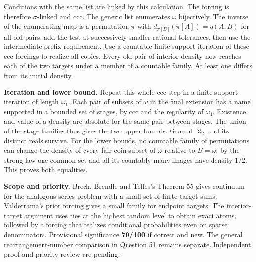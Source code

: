 \documentclass[11pt]{article}
\begin{document}
Conditions with the same list are linked by this calculation. The forcing is therefore \(\sigma\)-linked and ccc. The generic list enumerates \(\omega\) bijectively. The inverse of the enumerating map is a permutation \(\pi\) with \(d_{\pi[B]}(\pi[A])=q(A,B)\) for all old pairs: add the test at successively smaller rational tolerances, then use the intermediate-prefix requirement. Use a countable finite-support iteration of these ccc forcings to realize all copies. Every old pair of interior density now reaches each of the two targets under a member of a countable family. At least one differs from its initial density.

\textbf{Iteration and lower bound.} Repeat this whole ccc step in a finite-support iteration of length \(\omega_1\). Each pair of subsets of \(\omega\) in the final extension has a name supported in a bounded set of stages, by ccc and the regularity of \(\omega_1\). Existence and value of a density are absolute for the same pair between stages. The union of the stage families thus gives the two upper bounds. Ground \(\aleph_2\) and its distinct reals survive. For the lower bounds, no countable family of permutations can change the density of every fair-coin subset of \(\omega\) relative to \(B=\omega\): by the strong law one common set and all its countably many images have density \(1/2\). This proves both equalities.

\textbf{Scope and priority.} Brech, Brendle and Telles's Theorem 55 gives continuum for the analogous series problem with a small set of finite target sums. Valderrama's prior forcing gives a small family for endpoint targets. The interior-target argument uses ties at the highest random level to obtain exact atoms, followed by a forcing that realizes conditional probabilities even on sparse denominators. Provisional significance \textbf{70/100} if correct and new. The general rearrangement-number comparison in Question 51 remains separate. Independent proof and priority review are pending.
\end{document}
